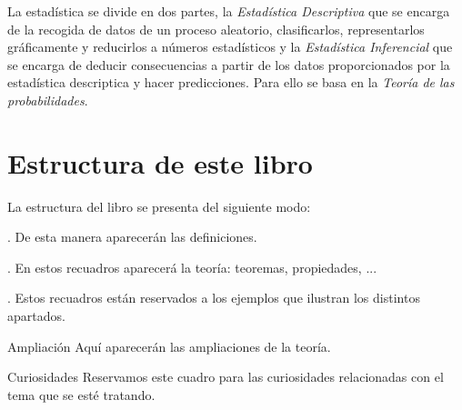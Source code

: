La estadística se divide en dos partes, la \emph{Estadística Descriptiva} que se encarga de la recogida de datos de un proceso aleatorio, clasificarlos, representarlos gráficamente y reducirlos a números estadísticos y la \emph{Estadística Inferencial} que se encarga de deducir consecuencias a partir de los datos proporcionados por la estadística descriptica y hacer predicciones. Para ello se basa en la \emph{Teoría de las probabilidades}.


\section{Estructura de este libro}




 
La estructura del libro se presenta del siguiente modo:

\vspace{5mm} %
\begin{definition}
. De esta manera aparecerán las definiciones.

\end{definition}

\vspace{5mm} %
\begin{theorem}
. En estos recuadros aparecerá la teoría: teoremas, propiedades, ...

\end{theorem}

\vspace{5mm} %
\begin{example}
.	Estos recuadros están reservados a los ejemplos que ilustran los distintos apartados.

\end{example}


\vspace{5mm} %
\begin{myalertblock}{Ampliación}
	Aquí aparecerán las ampliaciones de la teoría.
\end{myalertblock}


\vspace{5mm} %
\begin{myexampleblock}{Curiosidades}
	Reservamos este cuadro para     las curiosidades relacionadas con el tema que se esté tratando.
\end{myexampleblock}


